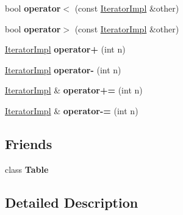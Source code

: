 \begin{DoxyCompactItemize}
\item 
\mbox{\label{class_table_1_1_iterator_impl_ab35c489b12d3943103d0c7713144fa57}} 
bool {\bfseries operator$<$} (const \hyperlink{class_table_1_1_iterator_impl}{Iterator\+Impl} \&other)
\item 
\mbox{\label{class_table_1_1_iterator_impl_a8e36e4e20a6a0da31139a1b57bdfd53a}} 
bool {\bfseries operator$>$} (const \hyperlink{class_table_1_1_iterator_impl}{Iterator\+Impl} \&other)
\item 
\mbox{\label{class_table_1_1_iterator_impl_a659d539fa5cfbb7e921bd7df846f4bc2}} 
\hyperlink{class_table_1_1_iterator_impl}{Iterator\+Impl} {\bfseries operator+} (int n)
\item 
\mbox{\label{class_table_1_1_iterator_impl_a9ce10f5972218ca9fa27a0aa186e7ecd}} 
\hyperlink{class_table_1_1_iterator_impl}{Iterator\+Impl} {\bfseries operator-\/} (int n)
\item 
\mbox{\label{class_table_1_1_iterator_impl_a27a9c10d44791c8967cb81047c750db8}} 
\hyperlink{class_table_1_1_iterator_impl}{Iterator\+Impl} \& {\bfseries operator+=} (int n)
\item 
\mbox{\label{class_table_1_1_iterator_impl_a17cd1624dbc72cc8e5842a5db4463709}} 
\hyperlink{class_table_1_1_iterator_impl}{Iterator\+Impl} \& {\bfseries operator-\/=} (int n)
\end{DoxyCompactItemize}
\subsection*{Friends}
\begin{DoxyCompactItemize}
\item 
\mbox{\label{class_table_1_1_iterator_impl_af888815e80064bc9fa1035c6265da86e}} 
class {\bfseries Table}
\end{DoxyCompactItemize}


\subsection{Detailed Description}
